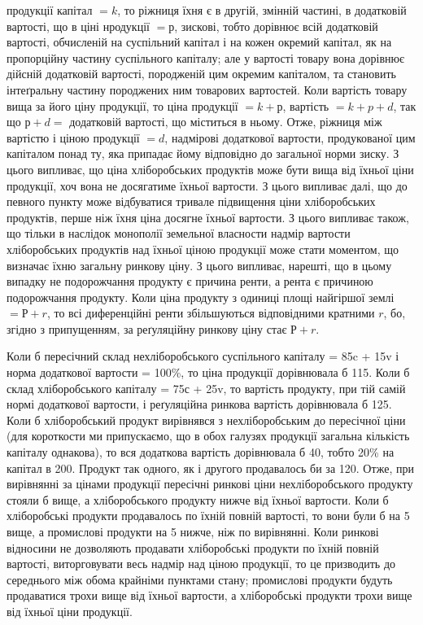 \parcont{}  %
продукції капітал $= k$, то ріжниця їхня є в другій, змінній частині, в додатковій
вартості, що в ціні нродукції $= р$, зискові, тобто дорівнює всій додатковій
вартості, обчисленій на суспільний капітал і на кожен окремий капітал, як на
пропорційну частину суспільного капіталу; але у вартості товару вона дорівнює
дійсній додатковій вартості, породженій цим окремим капіталом, та становить
інтеґральну частину породжених ним товарових вартостей. Коли вартість товару
вища за його ціну продукції, то ціна продукції $= k + р$, вартість $= k + p + d$,
так що $р + d =$ додатковій вартості, що міститься в ньому. Отже, ріжниця між
вартістю і ціною продукції $= d$, надмірові додаткової вартости, продукованої цим
капіталом понад ту, яка припадає йому відповідно до загальної норми зиску.
З цього випливає, що ціна хліборобських продуктів може бути вища від їхньої
ціни продукції, хоч вона не досягатиме їхньої вартости. З цього випливає
далі, що до певного пункту може відбуватися тривале підвищення ціни
хліборобських продуктів, перше ніж їхня ціна досягне їхньої вартости. З цього
випливає також, що тільки в наслідок монополії земельної власности надмір
вартости хліборобських продуктів над їхньої ціною продукції може стати моментом,
що визначає їхню загальну ринкову ціну. З цього випливає, нарешті,
що в цьому випадку не подорожчання продукту є причина ренти, а рента
є причиною подорожчання продукту. Коли ціна продукту з одиниці площі найгіршої
землі $= Р + r$, то всі диференційні ренти збільшуються відповідними кратними
$r$, бо, згідно з припущенням, за реґуляційну ринкову ціну стає $Р + r$.

Коли б пересічний склад нехліборобського суспільного капіталу =
85c + 15v і норма додаткової вартости = 100\%, то ціна продукції дорівнювала
б 115. Коли б склад хліборобського капіталу = 75с + 25v, то вартість
продукту, при тій самій нормі додаткової вартости, і реґуляційна ринкова
вартість дорівнювала б 125. Коли б хліборобський продукт вирівнявся з нехліборобським
до пересічної ціни (для короткости ми припускаємо, що в обох галузях
продукції загальна кількість капіталу однакова), то вся додаткова вартість
дорівнювала б 40, тобто 20\% на капітал в 200. Продукт так одного, як і другого
продавалось би за 120. Отже, при вирівнянні за цінами продукції пересічні ринкові
ціни нехліборобського продукту стояли б вище, а хліборобського продукту
нижче від їхньої вартости. Коли б хліборобські продукти продавалось по їхній
повній вартості, то вони були б на 5 вище, а промислові продукти
на 5 нижче, ніж по вирівнянні. Коли ринкові відносини не дозволяють продавати
хліборобські продукти по їхній повній вартості, виторговувати весь надмір
над ціною продукції, то це призводить до середнього між обома крайніми
пунктами стану; промислові продукти будуть продаватися трохи вище від їхньої
вартости, а хліборобські продукти трохи вище від їхньої ціни продукції.

